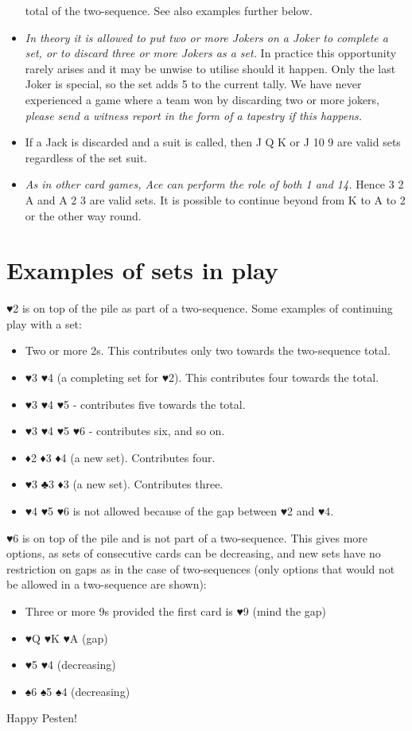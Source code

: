 \documentclass[a4paper,11pt,headings=standardclasses,parskip=half]{scrartcl}
\begin{document}
\begin{itemize}
        total of the two-sequence. See also examples further below.
  \item \emph{In theory it is allowed to put two or more Jokers on a Joker to
        complete a set, or to discard three or more Jokers as a set.} In
        practice this opportunity rarely arises and it may be unwise to utilise
        should it happen. Only the last Joker is special, so the set adds 5 to
        the current tally. We have never experienced a game where a team won by
        discarding two or more jokers, \emph{please send a witness report in the
        form of a tapestry if this happens.}
  \item If a Jack is discarded and a suit is called, then J Q K or J 10 9 are
        valid sets regardless of the set suit.
  \item \emph{As in other card games, Ace can perform the role of both 1 and
        14.} Hence 3 2 A and A 2 3 are valid sets. It is possible to continue
        beyond from K to A to 2 or the other way round.
 \end{itemize}

 \section{Examples of sets in play}

 ♥2 is on top of the pile as part of a two-sequence. Some examples of continuing
 play with a set:

 \begin{itemize}
  \item Two or more 2s. This contributes only two towards the two-sequence
        total.
  \item ♥3 ♥4 (a completing set for ♥2). This contributes four towards the
        total.
  \item ♥3 ♥4 ♥5 - contributes five towards the total.
  \item ♥3 ♥4 ♥5 ♥6 - contributes six, and so on.
  \item ♦2 ♦3 ♦4 (a new set). Contributes four.
  \item ♥3 ♣3 ♦3 (a new set). Contributes three.
  \item ♥4 ♥5 ♥6 is not allowed because of the gap between ♥2 and ♥4.
 \end{itemize}

 ♥6 is on top of the pile and is not part of a two-sequence. This gives more
 options, as sets of consecutive cards can be decreasing, and new sets have no
 restriction on gaps as in the case of two-sequences (only options that would
 not be allowed in a two-sequence are shown):

 \begin{itemize}
  \item Three or more 9s provided the first card is ♥9 (mind the gap)
  \item ♥Q ♥K ♥A (gap)
  \item ♥5 ♥4 (decreasing)
  \item ♠6 ♠5 ♠4 (decreasing)
 \end{itemize}

 Happy Pesten!
\end{document}
